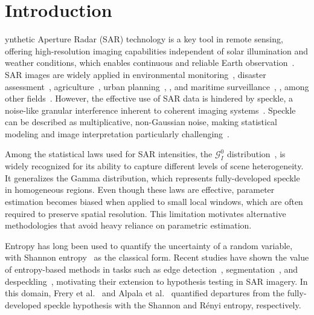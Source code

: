 \documentclass[
  lettersize  journal,
]{IEEEtran}%
\renewcommand*\tablename{Table}
\newcommand\tablename{Table}
\begin{document}
\renewcommand{\tablename}{TABLE}

\section{Introduction}\label{introduction}

ynthetic Aperture Radar (SAR) technology is a key tool
in remote sensing, offering high-resolution imaging capabilities
independent of solar illumination and weather conditions, which enables
continuous and reliable Earth
observation~. SAR images are widely
applied in environmental
monitoring~, disaster
assessment~,
agriculture~, urban
planning~,
,
and maritime surveillance~,
,
among other fields~. However, the
effective use of SAR data is hindered by speckle, a noise-like granular
interference inherent to coherent imaging
systems~. Speckle can be described
as multiplicative, non-Gaussian noise, making statistical modeling and
image interpretation particularly
challenging~.

Among the statistical laws used for SAR intensities, the
\(\mathcal{G}_I^0\) distribution~,
 is widely recognized for its
ability to capture different levels of scene heterogeneity. It
generalizes the Gamma distribution, which represents fully-developed
speckle in homogeneous regions. Even though these laws are effective,
parameter estimation becomes biased when applied to small local windows,
which are often required to preserve spatial resolution. This limitation
motivates alternative methodologies that avoid heavy reliance on
parametric estimation.

Entropy has long been used to quantify the uncertainty of a random
variable, with Shannon entropy~ as
the classical form. Recent studies have shown the value of entropy-based
methods in tasks such as edge
detection~,
segmentation~, and
despeckling~, motivating their
extension to hypothesis testing in SAR imagery. In this domain, Frery et
al.~ and Alpala et
al.~ quantified departures from the
fully-developed speckle hypothesis with the Shannon and Rényi entropy,
respectively.
\end{document}
